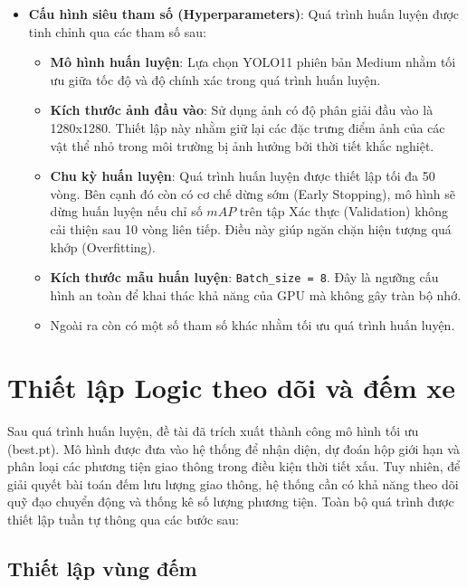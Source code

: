 \begin{itemize}
	\item \textbf{Cấu hình siêu tham số (Hyperparameters)}: Quá trình huấn luyện được tinh chỉnh qua các tham số sau:
	\begin{itemize}
		\item[$\circ$] \textbf{Mô hình huấn luyện}: Lựa chọn YOLO11 phiên bản Medium nhằm tối ưu giữa tốc độ và độ chính xác trong quá trình huấn luyện.
		
		\item[$\circ$] \textbf{Kích thước ảnh đầu vào}: Sử dụng ảnh có độ phân giải đầu vào là 1280x1280. Thiết lập này nhằm giữ lại các đặc trưng điểm ảnh của các vật thể nhỏ trong môi trường bị ảnh hưởng bởi thời tiết khắc nghiệt.
		
		\item[$\circ$] \textbf{Chu kỳ huấn luyện}: Quá trình huấn luyện được thiết lập tối đa 50 vòng. Bên cạnh đó còn có cơ chế dừng sớm (Early Stopping), mô hình sẽ dừng huấn luyện nếu chỉ số $mAP$ trên tập Xác thực (Validation) không cải thiện sau 10 vòng liên tiếp. Điều này giúp ngăn chặn hiện tượng quá khớp (Overfitting).
			
		\item[$\circ$] \textbf{Kích thước mẫu huấn luyện}: \texttt{Batch\_size = 8}. Đây là ngưỡng cấu hình an toàn  để khai thác khả năng của GPU mà không gây tràn bộ nhớ.
			
		\item[$\circ$] Ngoài ra còn có một số tham số khác nhằm tối ưu quá trình huấn luyện.
	\end{itemize}
\end{itemize}

\section{Thiết lập Logic theo dõi và đếm xe}

Sau quá trình huấn luyện, đề tài đã trích xuất thành công mô hình tối ưu (best.pt). Mô hình được đưa vào hệ thống để nhận diện, dự đoán hộp giới hạn và phân loại các phương tiện giao thông trong điều kiện thời tiết xấu. Tuy nhiên, để giải quyết bài toán đếm lưu lượng giao thông, hệ thống cần có khả năng theo dõi quỹ đạo chuyển động và thống kê số lượng phương tiện. Toàn bộ quá trình được thiết lập tuần tự thông qua các bước sau:

\subsection{Thiết lập vùng đếm}

